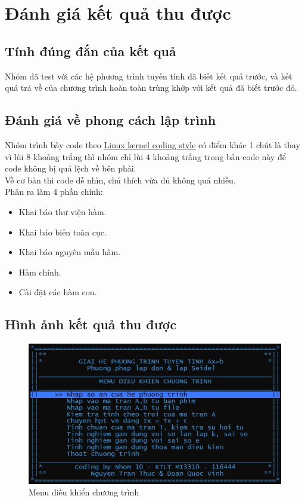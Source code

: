 \documentclass[twoside]{report2}
\begin{document}
\chapter{Đánh giá kết quả thu được}


\section{Tính đúng đắn của kết quả}
Nhóm đã test với các hệ phương trình tuyến tính đã biết kết quả trước, và kết quả trả về của chương trình hoàn toàn trùng khớp với kết quả đã biết trước đó.

\section{Đánh giá về phong cách lập trình}
Nhóm trình bày code theo \href{https://www.kernel.org/doc/html/v4.10/process/coding-style.html}{Linux kernel coding style} có điểm khác 1 chút là thay vì lùi 8 khoảng trắng thì nhóm chỉ lùi 4 khoảng trắng trong bản code này để code không bị quá lệch về bên phải.\\

Về cơ bản thì code dễ nhìn, chú thích vừa đủ không quá nhiều.\\

Phân ra làm 4 phần chính:
\begin{itemize}
	\item Khai báo thư viện hàm.
	\item Khai báo biến toàn cục.
	\item Khai báo nguyên mẫu hàm.
	\item Hàm chính.
	\item Cài đặt các hàm con.

\end{itemize}


\section{Hình ảnh kết quả thu được}

\begin{figure}[!h]
\centering
\includegraphics[scale=0.4]{figures/fig1}
\caption{Menu điều khiển chương trình}
\end{figure}
\end{document}
